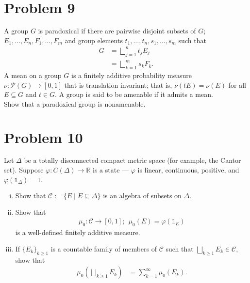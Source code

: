 \documentclass[10pt]{extarticle}
\newcommand{\R}{\mathbb{R}}
\begin{document}
  \section{Problem 9}%
  A group $G$ is paradoxical if there are pairwise disjoint subsets of $G$; $E_1,\dots,E_n,F_1,\dots,F_m$ and group elements $t_1,\dots,t_n,s_1,\dots,s_m$ such that
  \begin{align*}
    G &= \bigsqcup_{j=1}^{n}t_jE_j\\
      &= \bigsqcup_{k=1}^{m}s_kF_k.
  \end{align*}
  A mean on a group $G$ is a finitely additive probability measure $\nu: \mathcal{P}(G)\rightarrow [0,1]$ that is translation invariant; that is, $\nu(tE) = \nu(E)$ for all $E\subseteq G$ and $t\in G$. A group is said to be amenable if it admits a mean.\\

  Show that a paradoxical group is nonamenable.
  \section{Problem 10}%
  Let $\Delta$ be a totally disconnected compact metric space (for example, the Cantor set). Suppose $\varphi: C(\Delta)\rightarrow \R$ is a state --- $\varphi$ is linear, continuous, positive, and $\varphi\left(\mathbb{1}_{\Delta}\right) = 1$.
  \begin{enumerate}[(i)]
    \item Show that $\mathcal{C} := \{E\mid E\subseteq \Delta\}$ is an algebra of subsets on $\Delta$.
    \item Show that
      \begin{align*}
        \mu_0: \mathcal{C}\rightarrow [0,1];~~\mu_0(E) = \varphi\left(\mathbb{1}_{E}\right)
      \end{align*}
      is a well-defined finitely additive measure.
    \item If $\{E_k\}_{k\geq 1}$ is a countable family of members of $\mathcal{C}$ such that $\bigsqcup_{k\geq 1}E_k \in \mathcal{C}$, show that
      \begin{align*}
        \mu_0\left(\bigsqcup_{k\geq 1}E_k\right) &= \sum_{k=1}^{\infty}\mu_0(E_k).
      \end{align*}
  \end{enumerate}
\end{document}
